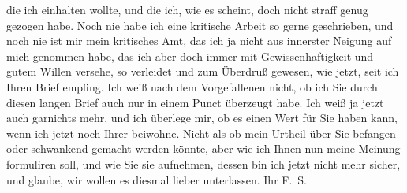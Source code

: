\begin{ledgroupsized}[t]{13cm}
               die ich einhalten wollte, und die ich, wie es scheint, doch nicht straff genug
               gezogen habe. \pend
           \pstart
           Noch nie habe ich eine kritische Arbeit so gerne geschrieben, und noch nie ist mir
               mein kritisches Amt, das ich ja nicht aus innerster Neigung auf mich genommen habe,
               das ich aber doch immer mit Gewissenhaftigkeit und gutem Willen versehe, so verleidet
               und zum Überdruß gewesen, wie jetzt, seit ich Ihren Brief empfing. \pend
           \pstart
           Ich weiß nach dem Vorgefallenen nicht, ob ich Sie durch diesen langen Brief auch nur
               in einem Punct überzeugt habe. Ich weiß ja jetzt auch garnichts mehr, und ich
               überlege mir, ob es einen Wert für Sie haben kann, wenn ich jetzt noch Ihrer \label{K_L03353-1112v}\label{K_L03353-1112h} beiwohne. Nicht als ob mein Urtheil über Sie befangen oder schwankend gemacht
               werden könnte, aber wie ich Ihnen nun meine Meinung formuliren soll, und wie Sie sie
               aufnehmen, dessen bin ich jetzt nicht mehr sicher, und glaube, wir wollen es diesmal
               lieber unterlassen. \pend
           \pstart Ihr \spacefill\mbox{F. S.}\pend{}
         
         \endnumbering{}\end{ledgroupsized}\begin{anhang}\end{anhang}\newcommand{\dateiname}{L03353}\newcommand{\titel}{Felix Salten an Arthur Schnitzler, [9. 11. 1903]}\newcommand{\editorInnen}{Martin Anton Müller und Laura Untner}
      